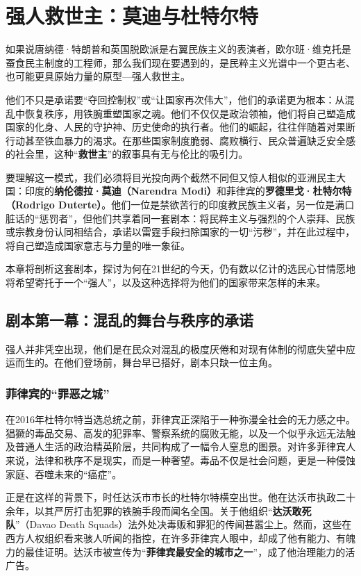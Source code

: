 \chapter{强人救世主：莫迪与杜特尔特}


如果说唐纳德·特朗普和英国脱欧派是右翼民族主义的表演者，欧尔班·维克托是蚕食民主制度的工程师，那么我们现在要遇到的，是民粹主义光谱中一个更古老、也可能更具原始力量的原型---强人救世主。

他们不只是承诺要``夺回控制权''或``让国家再次伟大''，他们的承诺更为根本：从混乱中恢复秩序，用铁腕重塑国家之魂。他们不仅仅是政治领袖，他们将自己塑造成国家的化身、人民的守护神、历史使命的执行者。他们的崛起，往往伴随着对果断行动甚至铁血暴力的渴求。在那些国家制度脆弱、腐败横行、民众普遍缺乏安全感的社会里，这种``\textbf{救世主}''的叙事具有无与伦比的吸引力。

要理解这一模式，我们必须将目光投向两个截然不同但又惊人相似的亚洲民主大国：印度的\textbf{纳伦德拉·莫迪（Narendra Modi）}和菲律宾的\textbf{罗德里戈·杜特尔特（Rodrigo Duterte）}。他们一位是禁欲苦行的印度教民族主义者，另一位是满口脏话的``惩罚者''，但他们共享着同一套剧本：将民粹主义与强烈的个人崇拜、民族或宗教身份认同相结合，承诺以雷霆手段扫除国家的一切``污秽''，并在此过程中，将自己塑造成国家意志与力量的唯一象征。

本章将剖析这套剧本，探讨为何在21世纪的今天，仍有数以亿计的选民心甘情愿地将希望寄托于一个``强人''，以及这种选择将为他们的国家带来怎样的未来。

\section{剧本第一幕：混乱的舞台与秩序的承诺}
强人并非凭空出现，他们是在民众对混乱的极度厌倦和对现有体制的彻底失望中应运而生的。在他们登场前，舞台早已搭好，剧本只缺一位主角。

\subsection{菲律宾的``罪恶之城''}

在2016年杜特尔特当选总统之前，菲律宾正深陷于一种弥漫全社会的无力感之中。猖獗的毒品交易、高发的犯罪率、警察系统的腐败无能，以及一个似乎永远无法触及普通人生活的政治精英阶层，共同构成了一幅令人窒息的图景。对许多菲律宾人来说，法律和秩序不是现实，而是一种奢望。毒品不仅是社会问题，更是一种侵蚀家庭、吞噬未来的``癌症''。

正是在这样的背景下，时任达沃市市长的杜特尔特横空出世。他在达沃市执政二十余年，以其严厉打击犯罪的铁腕手段而闻名全国。关于他组织``\textbf{达沃敢死队}''（Davao Death Squads）法外处决毒贩和罪犯的传闻甚嚣尘上。然而，这些在西方人权组织看来骇人听闻的指控，在许多菲律宾人眼中，却成了他有能力、有魄力的最佳证明。达沃市被宣传为``\textbf{菲律宾最安全的城市之一}''，成了他治理能力的活广告。

